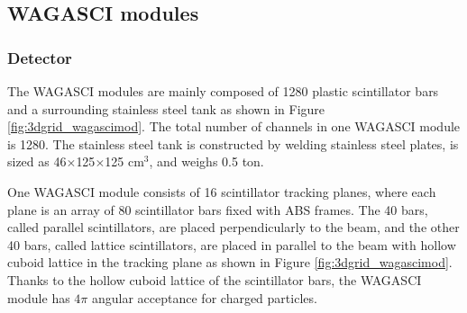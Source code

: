 \subsection{WAGASCI modules}
\subsubsection{Detector}
The WAGASCI modules are mainly composed of 1280 plastic scintillator bars and a surrounding stainless steel tank as shown in Figure \ref{fig:3dgrid_wagascimod}.
The total number of channels in one WAGASCI module is 1280.
The stainless steel tank is constructed by welding stainless steel plates, is sized as 46$\times$125$\times$125 cm$^{3}$, and weighs 0.5 ton. 


One WAGASCI module consists of 16 scintillator tracking planes, where each plane is an array of 80 scintillator bars fixed with ABS frames.
The 40 bars, called parallel scintillators, are placed perpendicularly to the beam, and the other 40 bars, called lattice scintillators, are placed in parallel to the beam with hollow cuboid lattice in the tracking plane as shown in Figure \ref{fig:3dgrid_wagascimod}.
Thanks to the hollow cuboid lattice of the scintillator bars, 
the WAGASCI module has $4\pi$ angular acceptance for charged particles.


